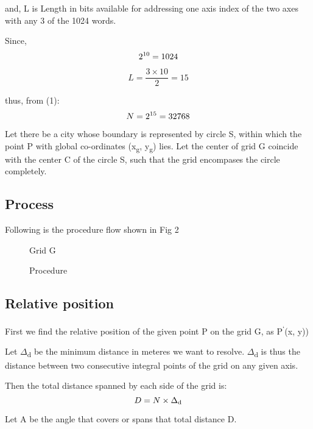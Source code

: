 \documentclass[conference]{IEEEtran}
\begin{document}
and, L is Length in bits available for addressing one axis index of the two axes with any 3 of the 1024 words.

Since, \begin{equation}2\textsuperscript{10}  = 1024\end{equation}

\begin{equation}L = \frac {3 \times 10} {2} = 15 \end{equation}

thus, from (1):
\begin{equation}N = 2\textsuperscript{15} = 32768 \end{equation}

Let there be a city whose boundary is represented by circle S, within which the point P with global co-ordinates (x\textsubscript{g}, y\textsubscript{g}) lies. Let the center of grid G coincide with the center C of the circle S, such that the grid encompases the circle completely.

\subsection{Process} Following is the procedure flow shown in Fig 2

\begin{figure}[!h]
\centerline{}
\caption{Grid G}
\label{Grid}
\end{figure}

\begin{figure}[!h]
\centerline{}
\caption{Procedure}
\label{Procedure}
\end{figure}

\subsection{Relative position} First we find the relative position of the given point P on the grid G, as P\textsuperscript{`}(x, y))

Let $\Delta$\textsubscript{d} be the minimum distance in meteres we want to resolve.
$\Delta$\textsubscript{d} is thus the distance between two consecutive integral points of the grid on any given axis.

Then the total distance spanned by each side of the grid is:
\begin{equation}D = N \times \Delta\textsubscript{d}\end{equation}

Let A be the angle that covers or spans that total distance D.
\end{document}
